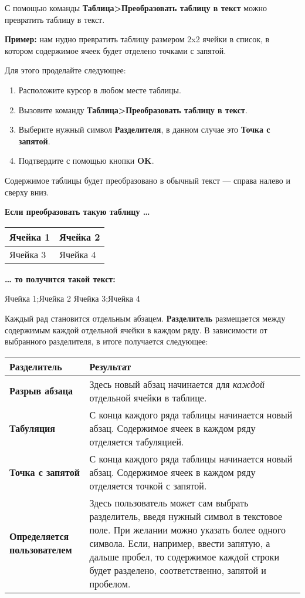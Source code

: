 ﻿\documentclass[a4paper,10pt]{article}
\begin{document}
С помощью команды \textbf{Таблица>Преобразовать таблицу в текст} можно превратить таблицу в текст.

\textbf{Пример:} нам нудно превратить таблицу размером 2x2 ячейки в список, в котором содержимое ячеек будет отделено точками с запятой.

Для этого проделайте следующее:

\begin{enumerate}
 \item Расположите курсор в любом месте таблицы.
 \item Вызовите команду \textbf{Таблица>Преобразовать таблицу в текст}.
 \item Выберите нужный символ \textbf{Разделителя}, в данном случае это \textbf{Точка с запятой}.
 \item Подтвердите с помощью кнопки \textbf{OK}.
\end{enumerate}

Содержимое таблицы будет преобразовано в обычный текст — справа налево и сверху вниз.

\textbf{Если преобразовать такую таблицу …}

\begin{center}
\begin{tabular}{ | m{3cm} | m{3cm} | }
\hline
 Ячейка 1 & Ячейка 2 \\ 
 \hline
 Ячейка 3 & Ячейка 4\\
\hline
\end{tabular}
\end{center}

\textbf{… то получится такой текст:}

Ячейка 1;Ячейка 2
Ячейка 3;Ячейка 4

Каждый рад становится отдельным абзацем. \textbf{Разделитель} размещается между содержимым каждой отдельной ячейки в каждом ряду. В зависимости от выбранного разделителя, в итоге получается следующее:

\begin{center}
\begin{tabular}{  m{3cm}  m{11cm}  }
 \textbf{Разделитель} & \textbf{Результат}\\ 
 \hline
  \textbf{Разрыв абзаца} & Здесь новый абзац начинается для \textit{каждой} отдельной ячейки в таблице.\\
  \hline
  \textbf{Табуляция} & С конца каждого ряда таблицы начинается новый абзац. Содержимое ячеек в каждом ряду отделяется табуляцией.\\
  \hline
\textbf{Точка с запятой} & С конца каждого ряда таблицы начинается новый абзац. Содержимое ячеек в каждом ряду отделяется точкой с запятой.\\
\hline
\textbf{Определяется пользователем} & Здесь пользователь может сам выбрать разделитель, введя нужный символ в текстовое поле. При желании можно указать более одного символа. Если, например, ввести запятую, а дальше пробел, то содержимое каждой строки будет разделено, соответственно, запятой и пробелом.\\
\hline
\end{tabular}
\end{center}
\end{document}
